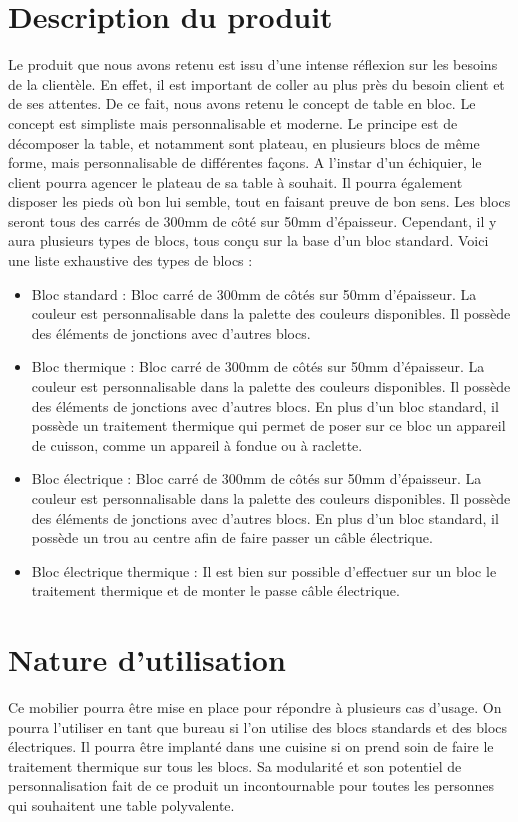 \section{Description du produit}
Le produit que nous avons retenu est issu d'une intense réflexion sur les besoins de la clientèle. En effet, il est important de coller au plus près du besoin client et de ses attentes. 
De ce fait, nous avons retenu le concept de table en bloc. Le concept est simpliste mais personnalisable et moderne. Le principe est de décomposer la table, et notamment sont plateau, en plusieurs blocs de même forme, mais personnalisable de différentes façons.
A l'instar d'un échiquier, le client pourra agencer le plateau de sa table à souhait. Il pourra également disposer les pieds où bon lui semble, tout en faisant preuve de bon sens. 
Les blocs seront tous des carrés de 300mm de côté sur 50mm d'épaisseur. Cependant, il y aura plusieurs types de blocs, tous conçu sur la base d'un bloc standard. Voici une liste exhaustive des types de blocs :
\begin{itemize}
\item Bloc standard : Bloc carré de 300mm de côtés sur 50mm d'épaisseur. La couleur est personnalisable dans la palette des couleurs disponibles. Il possède des éléments de jonctions avec d'autres blocs. 
\item Bloc thermique : Bloc carré de 300mm de côtés sur 50mm d'épaisseur. La couleur est personnalisable dans la palette des couleurs disponibles. Il possède des éléments de jonctions avec d'autres blocs. En plus d'un bloc standard, il possède un traitement thermique qui permet de poser sur ce bloc un appareil de cuisson, comme un appareil à fondue ou à raclette.
\item Bloc électrique : Bloc carré de 300mm de côtés sur 50mm d'épaisseur. La couleur est personnalisable dans la palette des couleurs disponibles. Il possède des éléments de jonctions avec d'autres blocs. En plus d'un bloc standard, il possède un trou au centre afin de faire passer un câble électrique.
\item Bloc électrique thermique : Il est bien sur possible d'effectuer sur un bloc le traitement thermique et de monter le passe câble électrique. 
\end{itemize}

\section{Nature d'utilisation}
Ce mobilier pourra être mise en place pour répondre à plusieurs cas d'usage. On pourra l'utiliser en tant que bureau si l'on utilise des blocs standards et des blocs électriques. Il pourra être implanté dans une cuisine si on prend soin de faire le traitement thermique sur tous les blocs. Sa modularité et son potentiel de personnalisation fait de ce produit un incontournable pour toutes les personnes qui souhaitent une table polyvalente.

